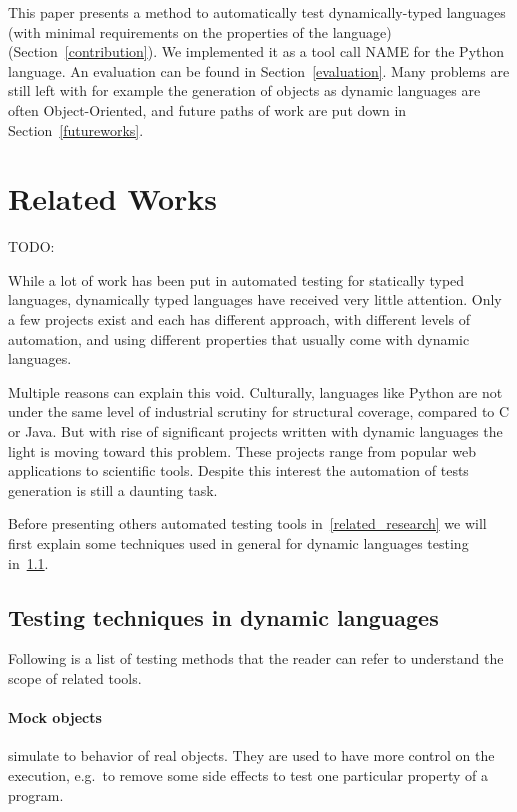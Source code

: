 \documentclass{llncs2e/llncs}
\def\todo#1{{\color{red}TODO:\quad#1}}
\begin{document}
This paper presents a method to automatically test dynamically-typed languages
(with minimal requirements on the properties of the language)
(Section~\ref{contribution}). We implemented it as a tool call NAME for the
Python language. An evaluation can be found in Section~\ref{evaluation}. Many
problems are still left with for example the generation of objects as dynamic
languages are often Object-Oriented, and future paths of work are put down in
Section~\ref{futureworks}.


\section{Related Works}
\label{relatedwork}
\todo{}

While a lot of work has been put in automated testing for statically typed
languages, dynamically typed languages have received very little attention. Only
a few projects exist and each has different approach, with different levels of
automation, and using different properties that usually come with dynamic
languages.

Multiple reasons can explain this void. Culturally, languages like Python are
not under the same level of industrial scrutiny for structural coverage,
compared to C or Java. But with rise of significant projects written with
dynamic languages the light is moving toward this problem. These projects range
from popular web applications to scientific tools. Despite this interest the
automation of tests generation is still a daunting task.

Before presenting others automated testing tools in~\ref{related_research} we
will first explain some techniques used in general for dynamic languages
testing in~\ref{techniques}.

\subsection{Testing techniques in dynamic languages}
\label{techniques}

Following is a list of testing methods that the reader can refer to understand
the scope of related tools.

\paragraph{Mock objects} simulate to behavior of real objects. They are used to
have more control on the execution, e.g.\ to remove some side effects to test
one particular property of a program.
\end{document}
